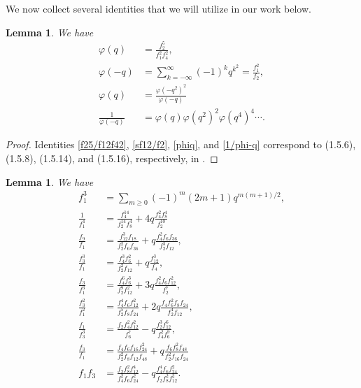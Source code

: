 \documentclass{amsart}
\newtheorem{lemma}[theorem]{Lemma}
\theoremstyle{definition}
\begin{document}
We now collect several identities that we will utilize in our work below.
\begin{lemma} We have
    \begin{align}
         \label{f25/f12f42} \varphi(q)&=\frac{f_2^5}{f_1^2f_4^2},\\
         \label{sf12/f2}\varphi(-q)&=\sum_{k=-\infty}^{\infty}(-1)^kq^{k^2}=\frac{f_1^2}{f_2},\\
        \label{phiq} \varphi(q)&=\frac{\varphi(-q^2)^2}{\varphi(-q)}\\\label{1/phi-q}\frac{1}{\varphi(-q)}&=\varphi(q)\varphi(q^2)^2\varphi(q^4)^4\cdots.
    \end{align}
\end{lemma}
\begin{proof}
Identities \eqref{f25/f12f42}, \eqref{sf12/f2}, \eqref{phiq}, and \eqref{1/phi-q} correspond to (1.5.6), (1.5.8), (1.5.14), and (1.5.16), respectively, in \cite{Hirschhorn}.
\end{proof}
\begin{lemma} We have
		\begin{align}
			\label{f13} f_1^3&=\sum_{m\geq0}(-1)^m(2m+1)q^{m(m+1)/2},\\
			\label{1/f14}\frac{1}{f_1^4}&=\frac{f_4^{14}}{f_2^{14}f_8^4}+4q\frac{f_4^2f_8^4}{f_2^{10}}\\
			\label{f9/f1}\frac{f_9}{f_1}&=\frac{f_{12}^3f_{18}}{f_2^2f_6f_{36}}+q\frac{f_4^2f_6f_{36}}{f_2^3f_{12}},\\
			\label{f33/f1} \frac{f_3^3}{f_1}&=\frac{f_4^3f_6^2}{f_2^2f_{12}}+q\frac{f_{12}^3}{f_4},\\
			\label{f3/f13}\frac{f_3}{f_1^3}&=\frac{f_4^6f_6^3}{f_2^9f_{12}^2}+3q\frac{f_4^2f_6f_{12}^2}{f_2^7},\\
			\label{f32/f12} \frac{f_3^2}{f_1^2}&=\frac{f_4^4f_6f_{12}^2}{f_2^5f_8f_{24}}+2q\frac{f_4f_6^2f_8f_{24}}{f_2^4f_{12}},\\
			\label{f1/f33}\frac{f_1}{f_3^3}&=\frac{f_2f_4^2f_{12}^2}{f_6^7}-q\frac{f_2^3f_{12}^6}{f_4^2f_6^9},\\
			\label{f3/f1}\frac{f_3}{f_1}&=\frac{f_4f_6f_{16}f_{24}^2}{f_2^2f_8f_{12}f_{48}}+q\frac{f_6f_8^2f_{48}}{f_2^2f_{16}f_{24}}\\
			\label{f1f3}f_1f_3&=\frac{f_2f_8^2f_{12}^4}{f_4^2f_6f_{24}^2}-q\frac{f_4^4f_6f_{24}^2}{f_2f_8^2f_{12}^2}.
		\end{align}
	\end{lemma}
\end{document}
